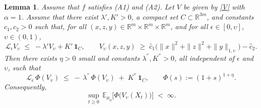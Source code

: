 \documentclass[11pt, a4paper,leqno]{amsart}
\newtheorem{lemma}{Lemma}[section]
\theoremstyle{definition}
\numberwithin{equation}{section}
\newcommand{\R}{\mathbb R}
\begin{document}
\begin{lemma}\label{lem:power-Lyap} Assume that $f$ satisfies \textnormal{(A1)} and \textnormal{(A2)}. Let $V$ be given by \eqref{V} with $\alpha=1$. Assume that there exist
$\lambda',K'>0$, a compact set $C\subset\R^{3m}$, and constants $c_1,c_2>0$ such that, for all $(x,z,y)\in \mathbb{R}^m \times \mathbb{R}^m \times \mathbb{R}^m$, and for all $\epsilon\in [0,\upsilon]$, $\upsilon\in (0,1)$,
\[
{\mathcal L_\epsilon}V_\upsilon \;\le\; -\lambda' V_\upsilon + K'\,\mathbf 1_{C},
\qquad
V_\upsilon(x,z,y)\;\ge\; \hat c_1\bigl(\|x\|^2+\|z\|^2+\|y\|_{1,\upsilon}\bigr)-\hat c_2.
\]
Then there exists $\eta>0$ small and
constants $\lambda^{''}, K^{''}>0$, all independent of $\epsilon$ and $\upsilon$, such that
\begin{equation}\label{eq:power-drift}
{\mathcal L_\epsilon}\,\Phi(V_\upsilon) \;\le\; -\,\lambda^{''}\,\Phi(V_\upsilon)\;+\; K^{''}\,\mathbf 1_{C},
\qquad
\Phi(s):=(1+s)^{1+\eta}.
\end{equation}
Consequently,
\[
\sup_{t\ge0}\,\mathbb E_{\mu_0}\bigl[\Phi\!\bigl(V_\upsilon(X_t)\bigr)\bigr]\;<\;\infty.
\]
\end{lemma}
\end{document}
